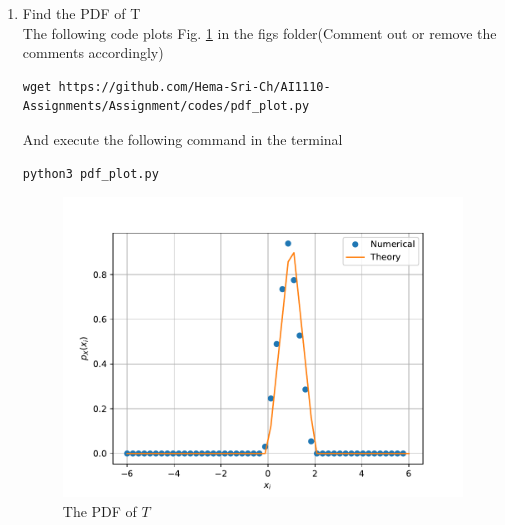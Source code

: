 \documentclass[journal,12pt,twocolumn]{article}
\renewcommand\thesection{\arabic{section}}
\begin{document}
\begin{enumerate}[label=\thesection.\arabic*
,ref=\thesection.\theenumi]
\item
Find the PDF of T
\\
\solution The following code plots Fig. \ref{fig:tri_pdf} in the figs folder(Comment out or remove the comments accordingly)
\begin{lstlisting}
wget https://github.com/Hema-Sri-Ch/AI1110-Assignments/Assignment/codes/pdf_plot.py
\end{lstlisting}
And execute the following command in the terminal 
\begin{lstlisting}
python3 pdf_plot.py
\end{lstlisting}
\begin{figure}[h]
	\centering
	\includegraphics[width=\columnwidth]{tri_pdf}
	\caption{The PDF of $T$}
	\label{fig:tri_pdf}
\end{figure}


\end{enumerate}
\end{document}
